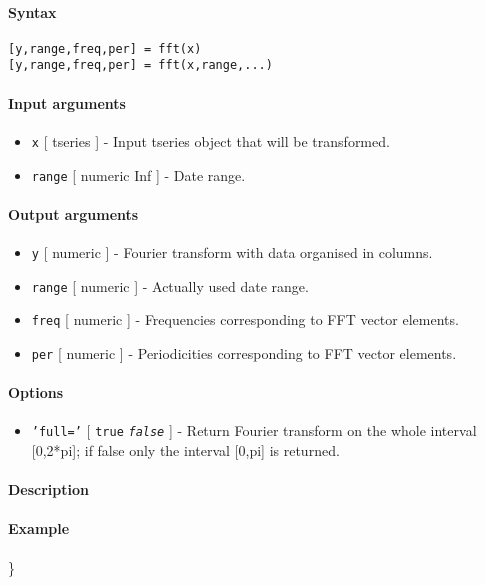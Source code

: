 


	\paragraph{Syntax}

\begin{verbatim}
[y,range,freq,per] = fft(x)
[y,range,freq,per] = fft(x,range,...)
\end{verbatim}

\paragraph{Input arguments}

\begin{itemize}
\item
  \texttt{x} {[} tseries {]} - Input tseries object that will be
  transformed.
\item
  \texttt{range} {[} numeric \textbar{} Inf {]} - Date range.
\end{itemize}

\paragraph{Output arguments}

\begin{itemize}
\item
  \texttt{y} {[} numeric {]} - Fourier transform with data organised in
  columns.
\item
  \texttt{range} {[} numeric {]} - Actually used date range.
\item
  \texttt{freq} {[} numeric {]} - Frequencies corresponding to FFT
  vector elements.
\item
  \texttt{per} {[} numeric {]} - Periodicities corresponding to FFT
  vector elements.
\end{itemize}

\paragraph{Options}

\begin{itemize}
\itemsep1pt\parskip0pt
\item
  \texttt{'full='} {[} \texttt{true} \textbar{} \emph{\texttt{false}}
  {]} - Return Fourier transform on the whole interval {[}0,2*pi{]}; if
  false only the interval {[}0,pi{]} is returned.
\end{itemize}

\paragraph{Description}

\paragraph{Example}

\}


